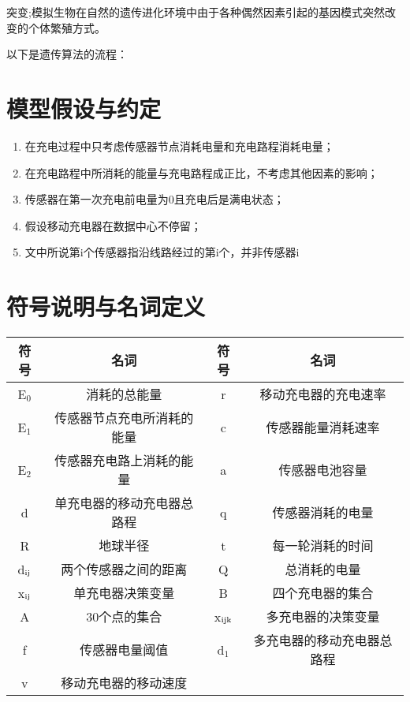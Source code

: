 \documentclass{article}
\begin{document}
突变;模拟生物在自然的遗传进化环境中由于各种偶然因素引起的基因模式突然改变的个体繁殖方式\cite{ref3}。

以下是遗传算法的流程：


\newpage                                                    %
\section{模型假设与约定}
\begin{enumerate}
\item 在充电过程中只考虑传感器节点消耗电量和充电路程消耗电量；
\item 在充电路程中所消耗的能量与充电路程成正比，不考虑其他因素的影响；
\item 传感器在第一次充电前电量为0且充电后是满电状态；
\item 假设移动充电器在数据中心不停留；
\item 文中所说第i个传感器指沿线路经过的第i个，并非传感器i
\end{enumerate}
\vspace{4em}
\section{符号说明与名词定义}
\vspace{4ex}                %
\begin{center}              %
    \begin{tabular}{cccc}
        \toprule
        符号    & 名词  & 符号  & 名词\\
        \midrule
        E$_0$  & 消耗的总能量        & r    & 移动充电器的充电速率    \\

        E$_1$  & 传感器节点充电所消耗的能量 & c    & 传感器能量消耗速率     \\

        E$_2$  & 传感器充电路上消耗的能量  & a    & 传感器电池容量       \\

        d   & 单充电器的移动充电器总路程 & q    & 传感器消耗的电量      \\

        R   & 地球半径          & t    & 每一轮消耗的时间      \\

        d$\rm _{ij}$ & 两个传感器之间的距离    & Q    & 总消耗的电量        \\

        x$\rm _{ij}$ & 单充电器决策变量      & B    & 四个充电器的集合      \\

        A   & 30个点的集合       & x$\rm _{ijk}$ & 多充电器的决策变量     \\

        f   & 传感器电量阈值       & d$_1$   & 多充电器的移动充电器总路程 \\

        v   & 移动充电器的移动速度    &      &   \\
        \bottomrule
    \end{tabular}
\end{center}
\end{document}
